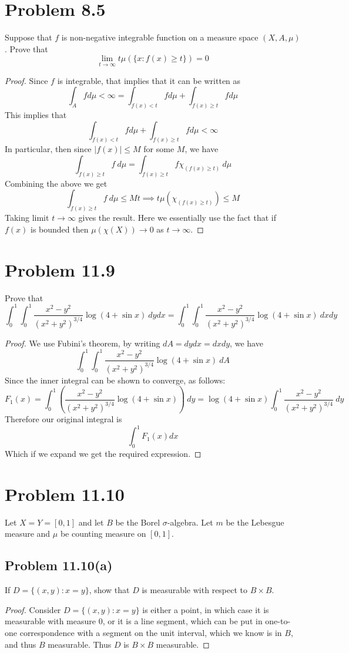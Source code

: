 \documentclass{article}
\begin{document}
\section*{Problem 8.5}Suppose that $f$ is non-negative integrable
function on a measure space $(X,A,\mu)$. Prove that
\[
\lim_{t\to\infty} t \mu(\{x : f(x) \ge t\})=0
\]
\begin{proof}
Since $f$ is integrable, that implies that it can be written as
\[
\int_A f d\mu < \infty = \int_{f(x)< t} f d\mu + \int_{f(x)\ge t} f d\mu
\]
This implies that
\[
\int_{f(x)< t} f d\mu + \int_{f(x)\ge t} f d\mu < \infty
\]
In particular, then since $|f(x)|\le M$ for some $M$, we have
\[
\int_{f(x)\ge t} f\ d\mu = \int_{f(x)\ge t} f \chi_{(f(x)\ge t)}\ d \mu
\]
Combining the above we get
\[
\int_{f(x)\ge t} f\ d\mu \le Mt \implies t \mu(\chi_{(f(x)\ge t)}) \le M
\]
Taking limit $t\to\infty$ gives the result. Here we essentially
use the fact that if $f(x)$ is bounded then $\mu(\chi(X))\to 0$
as $t\to\infty$.
\end{proof}


\section*{Problem 11.9} Prove that
\[
\int_0^1 \int_0^1 \frac{x^2-y^2}{(x^2+y^2)^{3/4}}\log(4 + \sin x)\ dy dx =
\int_0^1 \int_0^1 \frac{x^2-y^2}{(x^2+y^2)^{3/4}}\log(4 + \sin x)\ dx dy
\]
\begin{proof}
We use Fubini's theorem, by writing $dA=dydx = dxdy$, we have
\[
\int_0^1 \int_0^1 \frac{x^2-y^2}{(x^2+y^2)^{3/4}}\log(4 + \sin x)\ dA
\]
Since the inner integral can be shown to converge, as follows:
\[
F_1(x) = \int_0^1 \left(\frac{x^2-y^2}{(x^2+y^2)^{3/4}}\log(4 + \sin x)\right)\ dy
= \log(4+\sin x) \int_0^1 \frac{x^2-y^2}{(x^2+y^2)^{3/4}} \ dy
\]
Therefore our original integral is
\[
\int_0^1 F_1(x) dx
\]
Which if we expand we get the required expression.
\end{proof}

\section*{Problem 11.10} Let $X=Y=[0,1]$ and let $B$ be the 
Borel $\sigma$-algebra. Let $m$ be the Lebesgue measure and
$\mu$ be counting measure on $[0,1]$.
\subsection*{Problem 11.10(a)}If $D=\{(x,y): x=y\}$, show that
$D$ is measurable with respect to $B\times B$.
\begin{proof}
Consider $D=\{(x,y): x=y\}$ is either a point, in which case
it is measurable with measure 0, or it is a line segment, which
can be put in one-to-one correspondence with a segment on the
unit interval, which we know is in $B$, and thus $B$ measurable.
Thus $D$ is $B\times B$ measurable.
\end{proof}
\end{document}
